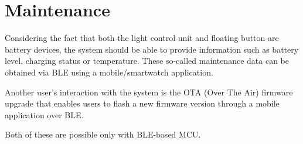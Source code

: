     \section{Maintenance}
       Considering the fact that both the light control unit and floating button are battery devices, the system should be able to provide information such as battery level,  charging status or temperature. These so-called maintenance data can be obtained via BLE using a mobile/smartwatch application.

        Another user's interaction with the system is the OTA (Over The Air) firmware upgrade that enables users to flash a new firmware version through a mobile application over BLE.

        Both of these are possible only with BLE-based MCU.
        
        
        
        